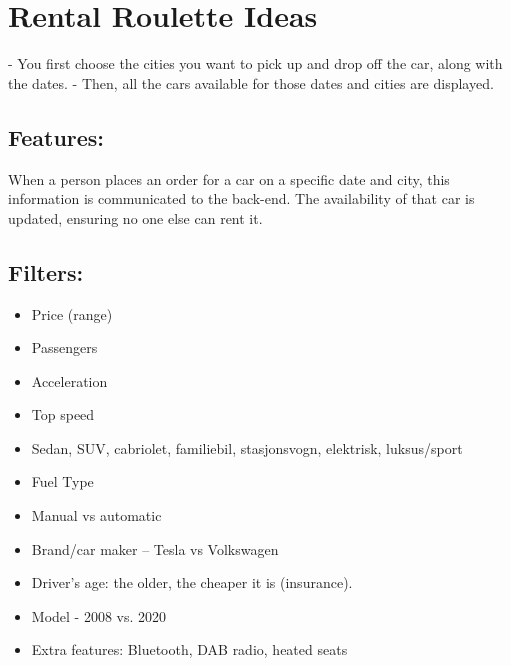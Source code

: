 \section{Rental Roulette Ideas}

- You first choose the cities you want to pick up and drop off the car, along with the dates.
- Then, all the cars available for those dates and cities are displayed.

\subsection{Features:}

When a person places an order for a car on a specific date and city, this information is communicated to the back-end. The availability of that car is updated, ensuring no one else can rent it.

\subsection{Filters:}
\begin{itemize}
    \item Price (range)
    \item Passengers
    \item Acceleration
    \item Top speed
    \item Sedan, SUV, cabriolet, familiebil, stasjonsvogn, elektrisk, luksus/sport
    \item Fuel Type
    \item Manual vs automatic
    \item Brand/car maker – Tesla vs Volkswagen
    \item Driver's age: the older, the cheaper it is (insurance).
    \item Model - 2008 vs. 2020
    \item Extra features: Bluetooth, DAB radio, heated seats
\end{itemize}

